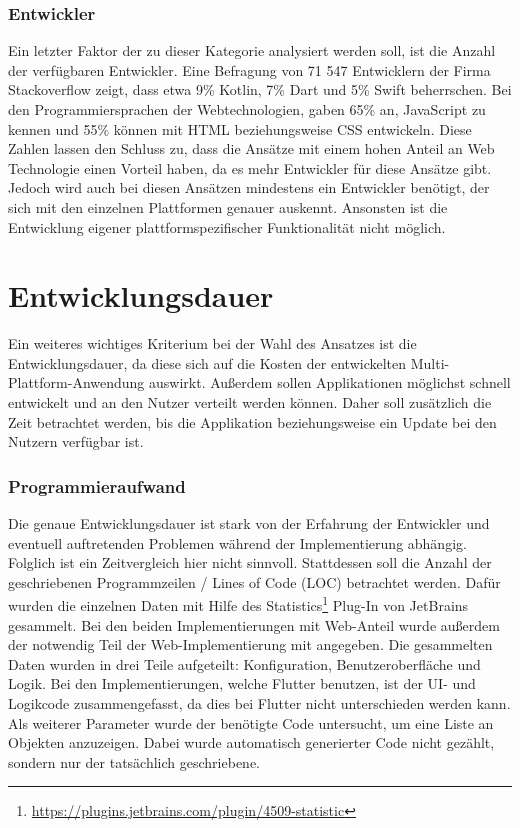 \subsubsection{Entwickler}
Ein letzter Faktor der zu dieser Kategorie analysiert werden soll, ist die Anzahl der verfügbaren Entwickler. Eine Befragung \cite{statist_used_programming_languages} von 71 547 Entwicklern der Firma Stackoverflow zeigt, dass etwa 9\% Kotlin, 7\% Dart und 5\% Swift beherrschen.
Bei den Programmiersprachen der Webtechnologien, gaben  65\% an, JavaScript zu kennen und 55\% können mit HTML beziehungsweise CSS entwickeln. Diese Zahlen lassen den Schluss zu, dass die Ansätze mit einem hohen Anteil an Web Technologie einen Vorteil haben, da es mehr Entwickler für diese Ansätze gibt. Jedoch wird auch bei diesen Ansätzen mindestens ein Entwickler benötigt, der sich mit den einzelnen Plattformen genauer auskennt. 
Ansonsten ist die Entwicklung eigener plattformspezifischer Funktionalität nicht möglich.

\section{Entwicklungsdauer}
Ein weiteres wichtiges Kriterium bei der Wahl des Ansatzes ist die Entwicklungsdauer, da diese sich auf die Kosten der entwickelten Multi-Plattform-Anwendung auswirkt. Außerdem sollen Applikationen möglichst schnell entwickelt und an den Nutzer verteilt werden können. Daher soll zusätzlich die Zeit betrachtet werden, bis die Applikation beziehungsweise ein Update bei den Nutzern verfügbar ist.

\subsubsection{Programmieraufwand}
Die genaue Entwicklungsdauer ist stark von der Erfahrung der Entwickler und eventuell auftretenden Problemen während der Implementierung abhängig. Folglich ist ein Zeitvergleich hier nicht sinnvoll. Stattdessen soll die Anzahl der geschriebenen Programmzeilen / Lines of Code (LOC) betrachtet werden.
Dafür wurden die einzelnen Daten mit Hilfe des Statistics\footnote{\url{https://plugins.jetbrains.com/plugin/4509-statistic}} Plug-In von JetBrains gesammelt.
Bei den beiden Implementierungen mit Web-Anteil wurde außerdem der notwendig Teil der Web-Implementierung mit angegeben. 
Die gesammelten Daten wurden in drei Teile aufgeteilt: Konfiguration, Benutzeroberfläche und Logik. 
Bei den Implementierungen, welche Flutter benutzen, ist der UI- und Logikcode zusammengefasst, da dies bei Flutter nicht unterschieden werden kann.
Als weiterer Parameter wurde der benötigte Code untersucht, um eine Liste an Objekten anzuzeigen.
Dabei wurde automatisch generierter Code nicht gezählt, sondern nur der tatsächlich geschriebene.


